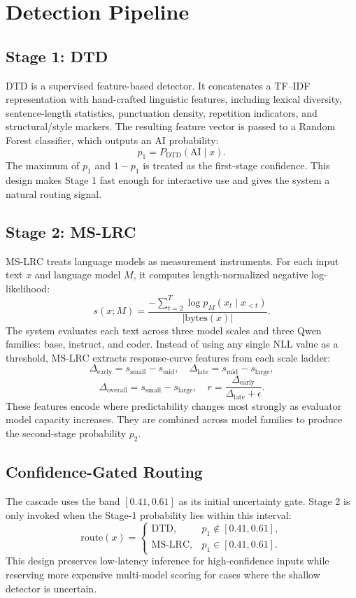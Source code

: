 \documentclass[11pt]{article}
\begin{document}
\section{Detection Pipeline}

\subsection{Stage 1: DTD}

DTD is a supervised feature-based detector. It concatenates a TF--IDF representation with hand-crafted linguistic features, including lexical diversity, sentence-length statistics, punctuation density, repetition indicators, and structural/style markers. The resulting feature vector is passed to a Random Forest classifier, which outputs an AI probability:
\[
p_1 = P_{\mathrm{DTD}}(\mathrm{AI}\mid x).
\]
The maximum of $p_1$ and $1-p_1$ is treated as the first-stage confidence. This design makes Stage 1 fast enough for interactive use and gives the system a natural routing signal.

\subsection{Stage 2: MS-LRC}

MS-LRC treats language models as measurement instruments. For each input text $x$ and language model $M$, it computes length-normalized negative log-likelihood:
\[
s(x;M)=\frac{-\sum_{t=2}^{T}\log p_M(x_t\mid x_{<t})}{|\mathrm{bytes}(x)|}.
\]
The system evaluates each text across three model scales and three Qwen families: base, instruct, and coder. Instead of using any single NLL value as a threshold, MS-LRC extracts response-curve features from each scale ladder:
\[
\Delta_{\mathrm{early}}=s_{\mathrm{small}}-s_{\mathrm{mid}}, \quad
\Delta_{\mathrm{late}}=s_{\mathrm{mid}}-s_{\mathrm{large}},
\]
\[
\Delta_{\mathrm{overall}}=s_{\mathrm{small}}-s_{\mathrm{large}}, \quad
r=\frac{\Delta_{\mathrm{early}}}{\Delta_{\mathrm{late}}+\epsilon}.
\]
These features encode where predictability changes most strongly as evaluator model capacity increases. They are combined across model families to produce the second-stage probability $p_2$.

\subsection{Confidence-Gated Routing}

The cascade uses the band $[0.41, 0.61]$ as its initial uncertainty gate. Stage 2 is only invoked when the Stage-1 probability lies within this interval:
\[
\mathrm{route}(x)=
\begin{cases}
\mathrm{DTD}, & p_1 \notin [0.41,0.61],\\
\mathrm{MS\mbox{-}LRC}, & p_1 \in [0.41,0.61].
\end{cases}
\]
This design preserves low-latency inference for high-confidence inputs while reserving more expensive multi-model scoring for cases where the shallow detector is uncertain.
\end{document}

